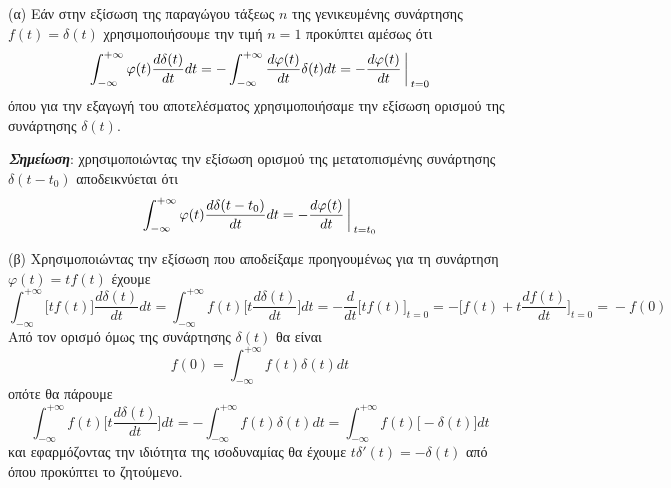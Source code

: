 \documentclass[a4paper,twoside,10pt,openany]{memoir}
\theoremstyle{dotless}
\begin{document}
\begin{solution}
(α) Εάν στην εξίσωση της παραγώγου τάξεως $n$ της γενικευμένης συνάρτησης $f(t)=\delta(t)$ χρησιμοποιήσουμε την τιμή $n=1$ προκύπτει αμέσως ότι
\begin{equation*}
\int_{-\infty}^{+\infty}\varphi(t)\frac{d\delta(t)}{dt}dt=-\int_{-\infty}^{+\infty}\frac{d\varphi(t)}{dt}\delta(t)dt=
-\frac{d\varphi(t)}{dt}\bigg\arrowvert_{t=0}
\end{equation*}
όπου για την εξαγωγή του αποτελέσματος χρησιμοποιήσαμε την εξίσωση ορισμού της συνάρτησης $\delta(t)$.\medskip

\noindent\emph {\textbf {Σημείωση}}: χρησιμοποιώντας την εξίσωση ορισμού της μετατοπισμένης συνάρτησης $\delta(t-t_0)$ αποδεικνύεται ότι
\begin{equation*}
\int_{-\infty}^{+\infty}\varphi(t)\frac{d\delta(t-t_0)}{dt}dt=-\frac{d\varphi(t)}{dt}\bigg\arrowvert_{t=t_0}
\end{equation*}

\noindent(β) Χρησιμοποιώντας την εξίσωση που αποδείξαμε προηγουμένως για τη συνάρτηση $\varphi(t)=tf(t)$ έχουμε
\begin{equation*}
\int_{-\infty}^{+\infty}\bigg[tf(t)\bigg]\frac{d\delta(t)}{dt}dt=\int_{-\infty}^{+\infty}f(t)\bigg[t\frac{d\delta(t)}{dt}\bigg]dt=
-\frac{d}{dt}\bigg[tf(t)\bigg]_{t=0}\!\!\!=-\bigg[f(t)+t\frac{df(t)}{dt}\bigg]_{t=0}\!\!\!\!=\!-f(0)
\end{equation*}
Από τον ορισμό όμως της συνάρτησης $\delta(t)$ θα είναι
\begin{equation*}
f(0)=\int_{-\infty}^{+\infty}f(t)\delta(t)dt
\end{equation*}
οπότε θα πάρουμε
\begin{equation*}
\int_{-\infty}^{+\infty}f(t)\bigg[t\frac{d\delta(t)}{dt}\bigg]dt=-\int_{-\infty}^{+\infty}f(t)\delta(t)dt=
\int_{-\infty}^{+\infty}f(t)\bigg[-\delta(t)\bigg]dt
\end{equation*}
και εφαρμόζοντας την ιδιότητα της ισοδυναμίας θα έχουμε $t\delta'(t)=-\delta(t)$ από όπου προκύπτει το ζητούμενο.
\end{solution}
\end{document}
